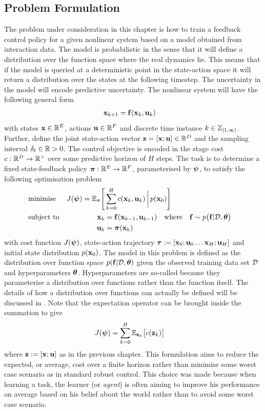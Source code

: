 \subsection{Problem Formulation}
The problem under consideration in this chapter is how to train a feedback control policy for a given nonlinear system based on a model obtained from interaction data. The model is probabilistic in the sense that it will define a distribution over the function space where the real dynamics lie. This means that if the model is queried at a deterministic point in the state-action space it will return a distribution over the states at the following timestep. The uncertainty in the model will encode predictive uncertainty. The nonlinear system will have the following general form
\begin{align}
\mathbf{x}_{k+1} &= \mathbf{f}(\mathbf{x}_{k},\mathbf{u}_{k}) \label{eqn:system} 
\end{align}
with states $\mathbf{x} \in \mathbb{R}^E$, actions $\mathbf{u} \in  \mathbb{R}^{F}$ and discrete time instance $k \in \mathbb{Z}_{[1,\infty)}$. Further, define the joint state-action vector $\mathbf{z} = [\mathbf{x}; \mathbf{u}] \in \mathbb{R}^D$ and the sampling interval $\delta_t \in \mathbb{R}>0$.
%
The control objective is encoded in the stage cost $c: \mathbb{R}^D \rightarrow \mathbb{R}^+$ over some predictive horizon of $H$ steps. The task is to determine a fixed state-feedback policy $\boldsymbol{\pi}: \mathbb{R}^E \rightarrow\mathbb{R}^F$, parameterised by $\boldsymbol{\psi}$, to satisfy the following optimisation problem
\begin{align}
& \text{minimise} & J(\bpsi) = \EE_{\btau}\Bigg[ & \sum_{k=0}^{H}  c(\bx_k,\bu_k) \,\bigg|\, p(\bx_0) \Bigg] \label{eqn:learn1} \\
&\text{subject to} & \bx_{k} &= \bff(\bx_{k-1},\bu_{k-1})
\quad \text{where} \quad \bff \sim p\big(\bff|\cD,\hyp\big) &  \label{eqn:learn2}  \\ %
\nonumber && \bu_k &= \bpi(\bx_k) 
\end{align}
with cost function $J(\boldsymbol{\psi})$, state-action trajectory $\boldsymbol{\tau} := [\mathbf{x}_0; \mathbf{u}_0 \dots \mathbf{x}_H;\mathbf{u}_H]$ and initial state distribution $p(\mathbf{x}_0)$. The model in this problem is defined as the distribution over function space $p(\mathbf{f}|\mathcal{D}, \boldsymbol{\theta})$ given the observed training data set $\mathcal{D}$ and hyperparameters $\boldsymbol{\theta}$. Hyperparameters are so-called because they parameterise a distribution over functions rather than the function itself. The details of how a distribution over functions can actually be defined will be discussed in . Note that the expectation operator can be brought inside the summation to give
\begin{align}
J(\boldsymbol{\psi}) &= \sum_{k=0}^{H} \mathbb{E}_{\mathbf{z}_k}\big[c(\mathbf{z}_k) \big] 
\label{eqn:Jcost}
\end{align}
where $\mathbf{z} := [\mathbf{x}; \mathbf{u}]$ as in the previous chapter. This formulation aims to reduce the expected, or average, cost over a finite horizon rather than minimise some worst case scenario as in standard robust control. This choice was made because when learning a task, the learner (or \textit{agent}) is often aiming to improve his performance on average based on his belief about the world rather than to avoid some worst case scenario.






